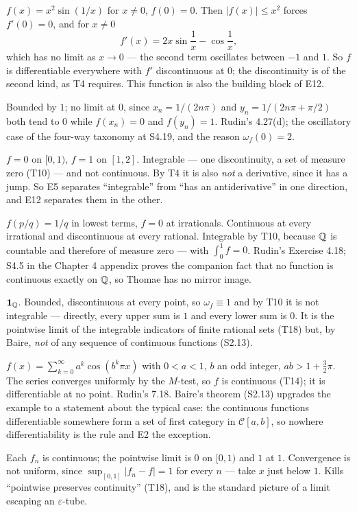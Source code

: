 $f(x) = x^2\sin(1/x)$ for $x \ne 0$, $f(0)=0$. Then
$|f(x)| \le x^2$ forces $f'(0) = 0$, and for $x \ne 0$
\[ f'(x) = 2x\sin\frac1x - \cos\frac1x , \]
which has no limit as $x \to 0$ --- the second term oscillates between $-1$
and $1$. So $f$ is differentiable everywhere with $f'$ discontinuous at $0$;
the discontinuity is of the second kind, as T4 requires. This function is
also the building block of E12.

Bounded by $1$; no limit at $0$, since $x_n = 1/(2n\pi)$ and
$y_n=1/(2n\pi + \pi/2)$ both tend to $0$ while $f(x_n)=0$ and $f(y_n)=1$.
Rudin's 4.27(d); the oscillatory case of the four-way taxonomy at S4.19, and
the reason $\omega_f(0)=2$.

$f = 0$ on $[0,1)$, $f=1$ on $[1,2]$. Integrable --- one discontinuity, a set
of measure zero (T10) --- and not continuous. By T4 it is also \emph{not} a
derivative, since it has a jump. So E5 separates ``integrable'' from ``has an
antiderivative'' in one direction, and E12 separates them in the other.

$f(p/q) = 1/q$ in lowest terms, $f = 0$ at irrationals. Continuous at every
irrational and discontinuous at every rational. Integrable by T10, because
$\mathbb{Q}$ is countable and therefore of measure zero --- with $\int_0^1 f = 0$.
Rudin's Exercise 4.18; S4.5 in the Chapter 4 appendix proves the companion
fact that no function is continuous exactly on $\mathbb{Q}$, so Thomae has no mirror
image.

$\mathbf 1_{\mathbb{Q}}$. Bounded, discontinuous at every point, so
$\omega_f \equiv 1$ and by T10 it is not integrable --- directly, every upper
sum is $1$ and every lower sum is $0$. It is the pointwise limit of the
integrable indicators of finite rational sets (T18) but, by Baire, \emph{not}
of any sequence of continuous functions (S2.13).

$f(x) = \sum_{k=0}^{\infty} a^k\cos(b^k\pi x)$ with $0<a<1$, $b$ an odd
integer, $ab > 1 + \tfrac32\pi$. The series converges uniformly by the
$M$-test, so $f$ is continuous (T14); it is differentiable at no point.
Rudin's 7.18. Baire's theorem (S2.13) upgrades the example to a statement
about the typical case: the continuous functions differentiable somewhere
form a set of first category in $\mathscr{C}[a,b]$, so nowhere
differentiability is the rule and E2 the exception.

Each $f_n$ is continuous; the pointwise limit is $0$ on $[0,1)$ and $1$ at
$1$. Convergence is not uniform, since
$\sup_{[0,1]}|f_n - f| = 1$ for every $n$ --- take $x$ just below $1$.
Kills ``pointwise preserves continuity'' (T18), and is the standard picture
of a limit escaping an $\varepsilon$-tube.

